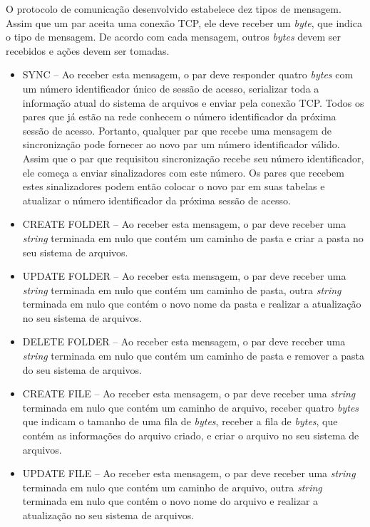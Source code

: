 \documentclass{article}
\begin{document}
\indent

O protocolo de comunicação desenvolvido estabelece dez tipos de mensagem. Assim que um par aceita uma conexão TCP, ele deve receber um \textit{byte}, que indica o tipo de mensagem. De acordo com cada mensagem, outros \textit{bytes} devem ser recebidos e ações devem ser tomadas.

\begin{itemize}
	\item SYNC -- Ao receber esta mensagem, o par deve responder quatro \textit{bytes} com um número identificador único de sessão de acesso, serializar toda a informação atual do sistema de arquivos e enviar pela conexão TCP. Todos os pares que já estão na rede conhecem o número identificador da próxima sessão de acesso. Portanto, qualquer par que recebe uma mensagem de sincronização pode fornecer ao novo par um número identificador válido. Assim que o par que requisitou sincronização recebe seu número identificador, ele começa a enviar sinalizadores com este número. Os pares que recebem estes sinalizadores podem então colocar o novo par em suas tabelas e atualizar o número identificador da próxima sessão de acesso.
	\item CREATE FOLDER -- Ao receber esta mensagem, o par deve receber uma \textit{string} terminada em nulo que contém um caminho de pasta e criar a pasta no seu sistema de arquivos.
	\item UPDATE FOLDER -- Ao receber esta mensagem, o par deve receber uma \textit{string} terminada em nulo que contém um caminho de pasta, outra \textit{string} terminada em nulo que contém o novo nome da pasta e realizar a atualização no seu sistema de arquivos.
	\item DELETE FOLDER -- Ao receber esta mensagem, o par deve receber uma \textit{string} terminada em nulo que contém um caminho de pasta e remover a pasta do seu sistema de arquivos.
	\item CREATE FILE -- Ao receber esta mensagem, o par deve receber uma \textit{string} terminada em nulo que contém um caminho de arquivo, receber quatro \textit{bytes} que indicam o tamanho de uma fila de \textit{bytes}, receber a fila de \textit{bytes}, que contém as informações do arquivo criado, e criar o arquivo no seu sistema de arquivos.
	\item UPDATE FILE -- Ao receber esta mensagem, o par deve receber uma \textit{string} terminada em nulo que contém um caminho de arquivo, outra \textit{string} terminada em nulo que contém o novo nome do arquivo e realizar a atualização no seu sistema de arquivos.

\end{itemize}
\end{document}
